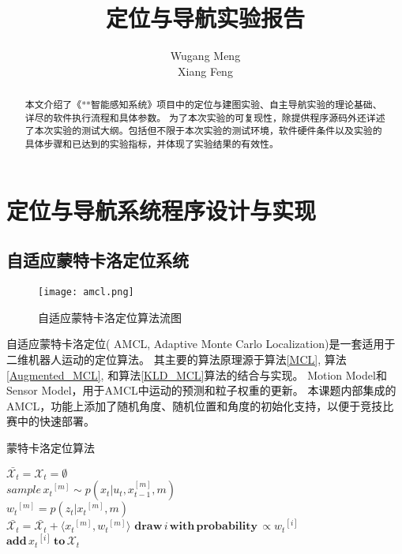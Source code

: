\documentclass[lang=cn,11pt,a4paper]{elegantpaper}
\title{定位与导航实验报告}
\author{Wugang Meng \\ Xiang Feng}
\institute{哈尔滨工业大学(威海)}
\date{\zhtoday}
\begin{document}
\maketitle

\begin{abstract}
本文介绍了《**智能感知系统》项目中的定位与建图实验、自主导航实验的理论基础、详尽的软件执行流程和具体参数。
为了本次实验的可复现性，除提供程序源码外还详述了本次实验的测试大纲。包括但不限于本次实验的测试环境，软件硬件条件以及实验的具体步骤和已达到的实验指标，并体现了实验结果的有效性。
\end{abstract}


\section{定位与导航系统程序设计与实现}

\subsection{自适应蒙特卡洛定位系统}

\begin{figure}[htbp]
  \centering
  \texttt{[image: amcl.png]}
  \caption{自适应蒙特卡洛定位算法流图}
  \label{fig:amcl}
\end{figure}

自适应蒙特卡洛定位( AMCL, Adaptive Monte Carlo Localization)是一套适用于二维机器人运动的定位算法。
其主要的算法原理源于算法\ref{MCL}, 算法\ref{Augmented_MCL}, 和算法\ref{KLD_MCL}算法的结合与实现。
Motion Model和Sensor Model，用于AMCL中运动的预测和粒子权重的更新。
本课题内部集成的AMCL，功能上添加了随机角度、随机位置和角度的初始化支持，以便于竞技比赛中的快速部署。
\begin{algorithm}
  \caption{蒙特卡洛定位算法}
  \label{MCL}
  $\bar{\mathcal X_t} = \mathcal X_t = \emptyset$ \\
  {
      $sample\,{ x_t}^{[m]} \sim p( x_t|u_t,{ x_{t-1}^{[m]}}, m)$ \\
      ${ w_t}^{[m]}=p( z_t|{ x_t}^{[m]}, m)$ \\
      $\bar{\mathcal X_t} = \bar{\mathcal X_t} + \langle { x_t}^{[m]},{ w_t}^{[m]} \rangle$
  }
  {
      $\mathbf{draw}\, i\, \mathbf{with}\,\mathbf{probability}\,\propto  {w_t}^{[i]}$ \\
      $\mathbf{add}\,{ x_t}^{[i]}\,\mathbf{to}\,\mathcal X_{t}$
  }
\end{algorithm}
\end{document}
